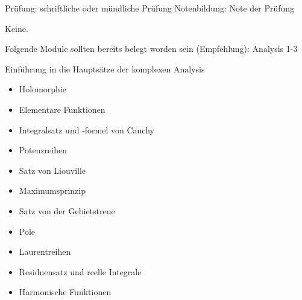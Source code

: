 \begin{course}

\setdoclanguagegerman
{}


\courselevel{}
\courseinstructionlanguage{}

\coursehead


\label{cour_8011.dp_997}


\begin{styleenv}
\begin{assessment}
Prüfung: schriftliche oder mündliche Prüfung\newline
Notenbildung: Note der Prüfung


\end{assessment}

\begin{conditions}Keine.\end{conditions}

\begin{recommendations}Folgende Module sollten bereits belegt worden sein (Empfehlung):\newline
Analysis 1-3

\end{recommendations}
\end{styleenv}

\begin{learningoutcomes}
Einführung in die Hauptsätze der komplexen Analysis


\end{learningoutcomes}

\begin{content}
\begin{itemize}\item Holomorphie  \item Elementare Funktionen  \item Integralsatz und -formel von Cauchy  \item Potenzreihen  \item Satz von Liouville  \item Maximumsprinzip  \item Satz von der Gebietstreue  \item Pole  \item Laurentreihen  \item Residuensatz und reelle Integrale  \item Harmonische Funktionen  \end{itemize}
\end{content}







\end{course}
